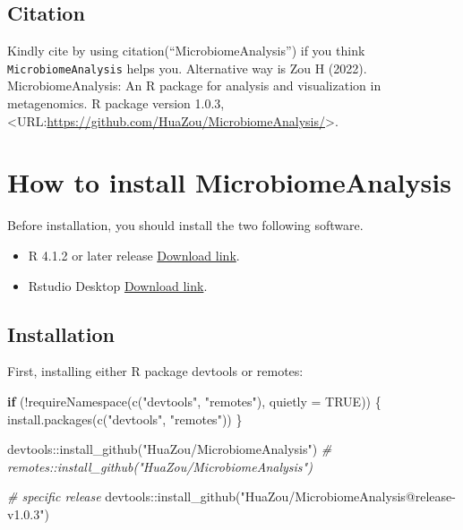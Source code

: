 \documentclass[
]{book}
\newenvironment{Shaded}{\begin{snugshade}}{\end{snugshade}}
\newcommand{\AttributeTok}[1]{\textcolor[rgb]{0.77,0.63,0.00}{#1}}
\newcommand{\CommentTok}[1]{\textcolor[rgb]{0.56,0.35,0.01}{\textit{#1}}}
\newcommand{\ConstantTok}[1]{\textcolor[rgb]{0.00,0.00,0.00}{#1}}
\newcommand{\ControlFlowTok}[1]{\textcolor[rgb]{0.13,0.29,0.53}{\textbf{#1}}}
\newcommand{\FunctionTok}[1]{\textcolor[rgb]{0.00,0.00,0.00}{#1}}
\newcommand{\NormalTok}[1]{#1}
\newcommand{\SpecialCharTok}[1]{\textcolor[rgb]{0.00,0.00,0.00}{#1}}
\newcommand{\StringTok}[1]{\textcolor[rgb]{0.31,0.60,0.02}{#1}}
\begin{document}
\hypertarget{citation}{%
\section{Citation}\label{citation}}

Kindly cite by using citation(``MicrobiomeAnalysis'') if you think \texttt{MicrobiomeAnalysis} helps you. Alternative way is Zou H (2022). MicrobiomeAnalysis: An R package for analysis and visualization in metagenomics. R package version 1.0.3, \textless URL:\url{https://github.com/HuaZou/MicrobiomeAnalysis/}\textgreater.

\hypertarget{how-to-install-microbiomeanalysis}{%
\chapter{How to install MicrobiomeAnalysis}\label{how-to-install-microbiomeanalysis}}

Before installation, you should install the two following software.

\begin{itemize}
\item
  R 4.1.2 \citep{R-base} or later release \href{https://mirrors.tuna.tsinghua.edu.cn/CRAN/}{Download link}.
\item
  Rstudio Desktop \href{https://www.rstudio.com/products/rstudio/download/\#download}{Download link}.
\end{itemize}

\hypertarget{installation}{%
\section{Installation}\label{installation}}

First, installing either R package devtools or remotes:

\begin{Shaded}
\begin{Highlighting}[]
\ControlFlowTok{if}\NormalTok{ (}\SpecialCharTok{!}\FunctionTok{requireNamespace}\NormalTok{(}\FunctionTok{c}\NormalTok{(}\StringTok{"devtools"}\NormalTok{, }\StringTok{"remotes"}\NormalTok{), }\AttributeTok{quietly =} \ConstantTok{TRUE}\NormalTok{)) \{}
  \FunctionTok{install.packages}\NormalTok{(}\FunctionTok{c}\NormalTok{(}\StringTok{"devtools"}\NormalTok{, }\StringTok{"remotes"}\NormalTok{))}
\NormalTok{\}}

\NormalTok{devtools}\SpecialCharTok{::}\FunctionTok{install\_github}\NormalTok{(}\StringTok{"HuaZou/MicrobiomeAnalysis"}\NormalTok{)}
\CommentTok{\# remotes::install\_github("HuaZou/MicrobiomeAnalysis")}

\CommentTok{\# specific release}
\NormalTok{devtools}\SpecialCharTok{::}\FunctionTok{install\_github}\NormalTok{(}\StringTok{"HuaZou/MicrobiomeAnalysis@release{-}v1.0.3"}\NormalTok{)}
\end{Highlighting}
\end{Shaded}
\end{document}
